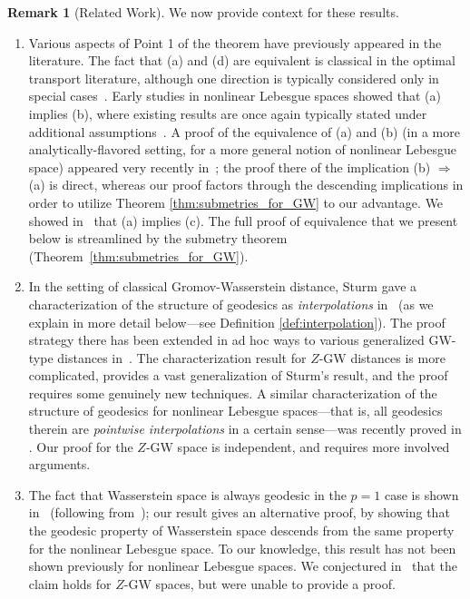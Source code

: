 \documentclass{article}
\theoremstyle{definition}
\newtheorem{remark}[proposition]{Remark}
\begin{document}
\begin{remark}[Related Work]\label{remark:related_work_geodesics}
We now provide context for these results. 
\begin{enumerate}[label=(\arabic*)]
    \item Various aspects of Point 1 of the theorem have previously appeared in the literature. The fact that (a) and (d) are equivalent is classical in the optimal transport literature, although one direction is typically considered only in special cases~\cite{villani2008optimal}. Early studies in nonlinear Lebesgue spaces showed that (a) implies (b), where existing results are once again typically stated under additional assumptions~\cite{jost2012nonpositive,sturm2003probability}. A proof of the equivalence of (a) and (b) (in a more analytically-flavored setting, for a more general notion of nonlinear Lebesgue space) appeared very recently in~\cite[Theorem 4.9]{serieys2026nonlinear}; the proof there of the implication (b) $\Rightarrow$ (a) is direct, whereas our proof factors through the descending implications in order to utilize Theorem \ref{thm:submetries_for_GW} to our advantage. We showed in~\cite{bauer2025zgromovwassersteindistance} that (a) implies (c). The full proof of equivalence that we present below is streamlined by the submetry theorem (Theorem~\ref{thm:submetries_for_GW}). 
     \item In the setting of classical Gromov-Wasserstein distance, Sturm gave a characterization of the structure of geodesics as  \emph{interpolations} in~\cite{sturm2020} (as we explain in more detail below---see Definition \ref{def:interpolation}). The proof strategy there has been extended in ad hoc ways to various generalized GW-type distances in~\cite{chowdhury2020gromov,zhang2024geometry,zhang2025topological}. The characterization result for $Z$-GW distances is more complicated, provides a vast generalization of Sturm's result, and the proof requires some genuinely new techniques. A similar characterization of the structure of geodesics for nonlinear Lebesgue spaces---that is, all geodesics therein are \emph{pointwise interpolations} in a certain sense---was recently proved in \cite[Theorem 4.2]{serieys2026nonlinear}. Our proof for the $Z$-GW space is independent, and requires more involved arguments.
    \item The fact that Wasserstein space is always geodesic in the $p=1$ case is shown in~\cite[Theorem 3.16]{memoli2023characterization} (following  from~\cite[Theorem 5.1]{bottou2018geometrical}); our result gives an alternative proof, by showing that the geodesic property of Wasserstein space descends from the same property for the nonlinear Lebesgue space. To our knowledge, this result has not been shown previously for nonlinear Lebesgue spaces. We conjectured in~\cite{bauer2025zgromovwassersteindistance} that the claim holds for $Z$-GW spaces, but were unable to provide a proof.
\end{enumerate}
\end{remark}
\end{document}
